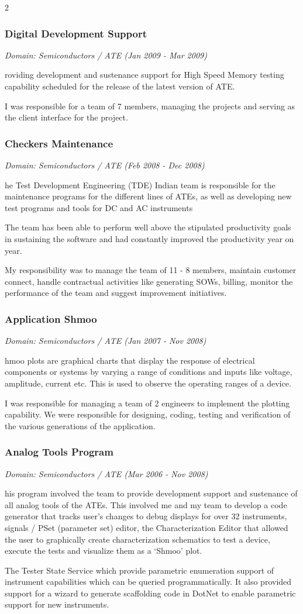 \documentclass[a4paper,11pt]{article}
\newcommand\cvprojectentry[5]{
  \subsubsection*{#1}
  
  \vspace{-7pt}
  
  \it{Domain: #2}\normalfont{} \quad (#3 - #4)
  
}
\begin{document}
\begin{multicols}{2}
\cvprojectentry{Digital Development Support}{Semiconductors / ATE}{Jan 2009}{Mar 2009}
 
Providing development and sustenance support for High Speed Memory
testing capability scheduled for the release of the latest version of
ATE.
 
I was responsible for a team of 7 members, managing the projects and
serving as the client interface for the project.
 
\cvprojectentry{Checkers Maintenance}{Semiconductors / ATE}{Feb 2008}{Dec 2008}

The Test Development Engineering (TDE) Indian team is responsible for
the maintenance programs for the different lines of ATEs, as well as
developing new test programs and tools for DC and AC instruments

The team has been able to perform well above the stipulated
productivity goals in sustaining the software and had constantly
improved the productivity year on year.
 
My responsibility was to manage the team of 11 - 8 members, maintain
customer connect, handle contractual activities like generating SOWs,
billing, monitor the performance of the team and suggest improvement
initiatives.
 
\cvprojectentry{Application Shmoo}{Semiconductors / ATE}{Jan 2007}{Nov 2008}

Shmoo plots are graphical charts that display the response of
electrical components or systems by varying a range of conditions and
inputs like voltage, amplitude, current etc. This is used to observe
the operating ranges of a device.
 
I was responsible for managing a team of 2 engineers to implement the
plotting capability. We were responsible for designing, coding, testing
and verification of the various generations of the application.
 
\cvprojectentry{Analog Tools Program}{Semiconductors / ATE}{Mar 2006}{Nov 2008}

This program involved the team to provide development support and
sustenance of all analog tools of the ATEs. This involved me and my
team to develop a code generator that tracks user's changes to debug
displays for over 32 instruments, signals / PSet (parameter set)
editor, the Characterization Editor that allowed the user to
graphically create characterization schematics to test a device,
execute the tests and visualize them as a `Shmoo' plot.

The Tester State Service which provide parametric enumeration support
of instrument capabilities which can be queried programmatically. It
also provided support for a wizard to generate scaffolding code in
DotNet to enable parametric support for new instruments.
 

\end{multicols}
\end{document}
